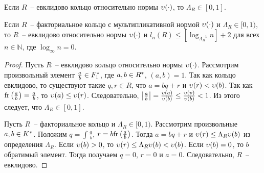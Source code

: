 \documentclass[_00_dissertation.tex]{subfiles}
\begin{document}
\begin{theorem}\label{theorem:euclidean_and_lambda}
    Если $R$~-- евклидово кольцо относительно нормы $\upsilon(\cdot)$, то $\Lambda_R \in [0, 1]$.

    Если $R$~-- факториальное кольцо с мультипликативной нормой $\upsilon(\cdot)$ и $\Lambda_R \in [0, 1)$, то $R$~-- евклидово относительно нормы $\upsilon(\cdot)$ и $l_n(R) \le [\log_{\Lambda_R^{-1}} n] + 2$ для всех $n \in \mathbb{N}$, где $\log_{\infty} n = 0$.
\end{theorem}
\begin{proof}
    Пусть $R$~-- евклидово кольцо относительно нормы $\upsilon(\cdot)$.
    Рассмотрим произвольный элемент $\frac{a}{b} \in F_1^{*}$, где $a, b \in R^{*}$, $(a, b) = 1$.
    Так как кольцо евклидово, то существуют такие $q, r \in R$, что $a = bq + r$ и $\upsilon(r) < \upsilon(b)$.
    Так как $\textrm{fr}\left(\frac{a}{b}\right) = \frac{a}{b}$, то $\upsilon(a) \le \upsilon(r)$.
    Следовательно, $\left|\frac{a}{b}\right| = \frac{\upsilon(a)}{\upsilon(b)} \le \frac{\upsilon(v)}{\upsilon(b)} < 1$.
    Из этого следует, что $\Lambda_R \in [0, 1]$.

    Пусть $R$~-- факториальное кольцо и $\Lambda_R \in [0, 1)$.
    Рассмотрим произвольные $a, b \in K^{*}$.
    Положим $q = \int{\frac{a}{b}}$, $r = b\textrm{fr}\left(\frac{a}{b}\right)$.
    Тогда $a = bq + r$ и $\upsilon(r) \le \Lambda_R \upsilon(b)$ из определения $\Lambda_R$.
    Если $\upsilon(b) > 0$, то $\upsilon(r) \le \Lambda_R \upsilon(b) < \upsilon(b)$.
    Если $\upsilon(b) = 0$, то $b$ обратимый элемент.
    Тогда получаем $q = 0$, $r = 0$ и $a = 0$.
    Следовательно, $R$~-- евклидово.
\end{proof}
\end{document}
